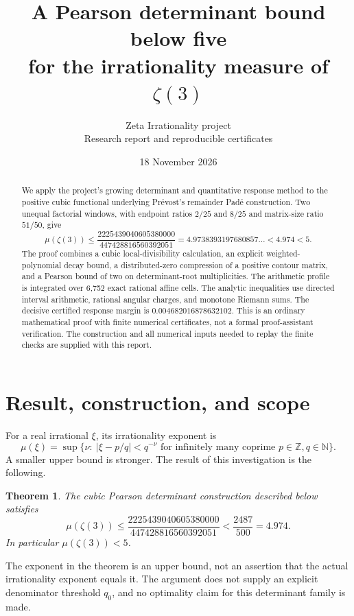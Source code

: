 \documentclass[11pt]{article}
\title{A Pearson determinant bound below five\\for the irrationality measure of $\zeta(3)$}
\author{Zeta Irrationality project\\\small Research report and reproducible certificates}
\date{18 November 2026}
\newtheorem{theorem}{Theorem}[section]
\theoremstyle{definition}\newtheorem{definition}[theorem]{Definition}
\theoremstyle{remark}\newtheorem{remark}[theorem]{Remark}
\begin{document}
\maketitle
\begin{abstract}
We apply the project's growing determinant and quantitative response method to the positive cubic functional underlying Pr\'evost's remainder Pad\'e construction. Two unequal factorial windows, with endpoint ratios $2/25$ and $8/25$ and matrix-size ratio $51/50$, give
\[
 \mu(\zeta(3))\le
 \frac{2225439040605380000}{447428816560392051}
 =4.9738393197680857\ldots<4.974<5.
\]
The proof combines a cubic local-divisibility calculation, an explicit weighted-polynomial decay bound, a distributed-zero compression of a positive contour matrix, and a Pearson bound of two on determinant-root multiplicities. The arithmetic profile is integrated over 6,752 exact rational affine cells. The analytic inequalities use directed interval arithmetic, rational angular charges, and monotone Riemann sums. The decisive certified response margin is $0.004682016878632102$. This is an ordinary mathematical proof with finite numerical certificates, not a formal proof-assistant verification. The construction and all numerical inputs needed to replay the finite checks are supplied with this report.
\end{abstract}
\clearpage
\tableofcontents
\newpage
\section{Result, construction, and scope}
For a real irrational $\xi$, its irrationality exponent is
\[
 \mu(\xi)=\sup\{\nu:\ |\xi-p/q|<q^{-\nu}
       \text{ for infinitely many coprime }p\in\mathbb Z,q\in\mathbb N\}.
\]
A smaller upper bound is stronger. The result of this investigation is the following.
\begin{theorem}\label{thm:main}
The cubic Pearson determinant construction described below satisfies
\[
 \boxed{\displaystyle
 \mu(\zeta(3))\le
 \frac{2225439040605380000}{447428816560392051}
 <\frac{2487}{500}=4.974.}
\]
In particular $\mu(\zeta(3))<5$.
\end{theorem}
The exponent in the theorem is an upper bound, not an assertion that the actual irrationality exponent equals it. The argument does not supply an explicit denominator threshold $q_0$, and no optimality claim for this determinant family is made.
\end{document}
